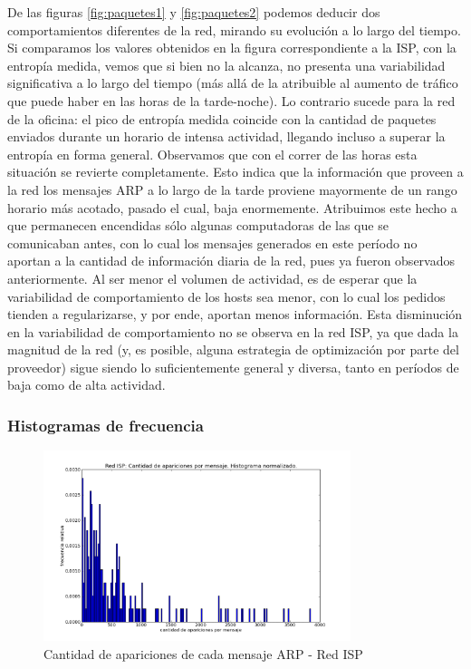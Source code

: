 De las figuras \ref{fig:paquetes1} y \ref{fig:paquetes2} podemos deducir dos comportamientos diferentes de la red, mirando su evolución a lo largo del tiempo. Si comparamos los valores obtenidos en la figura correspondiente a la ISP, con la entropía medida, vemos que si bien no la alcanza, no presenta una variabilidad significativa a lo largo del tiempo (más allá de la atribuible al aumento de tráfico que puede haber en las horas de la tarde-noche). Lo contrario sucede para la red de la oficina: el pico de entropía medida coincide con la cantidad de paquetes enviados durante un horario de intensa actividad, llegando incluso a superar la entropía en forma general. Observamos que con el correr de las horas esta situación se revierte completamente. Esto indica que la información que proveen a la red los mensajes ARP a lo largo de la tarde proviene mayormente de un rango horario más acotado, pasado el cual, baja enormemente. Atribuimos este hecho a que permanecen encendidas sólo algunas computadoras de las que se 
comunicaban antes, con lo cual los mensajes generados en este período no aportan a la cantidad de información diaria de la red, pues ya fueron observados anteriormente. Al ser menor el volumen de actividad, es de esperar que la variabilidad de comportamiento de los hosts sea menor, con lo cual los pedidos tienden a regularizarse, y por ende, aportan menos información. Esta disminución en la variabilidad de comportamiento no se observa en la red ISP, ya que dada la magnitud de la red (y, es posible, alguna estrategia de optimización por parte del proveedor) sigue siendo lo suficientemente general y diversa, tanto en períodos de baja como de alta actividad.

\subsubsection{Histogramas de frecuencia}

\begin{figure}[H]
	\centering
	\includegraphics[width=0.8\textwidth]{graficos/hist_casa.png}
	\caption{Cantidad de apariciones de cada mensaje ARP - Red ISP}
	\label{fig:hist5}
\end{figure}

